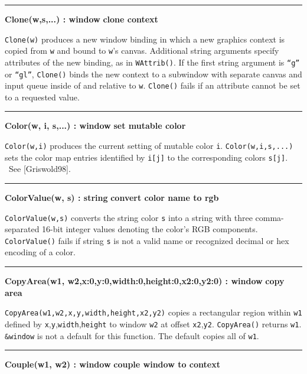 \bigskip\hrule\vspace{0.1cm}
\noindent
{\bf Clone(w,s,...) : window } \hfill {\bf clone context}

\noindent
\texttt{Clone(w)} produces a new window binding in which a new graphics
context is copied from \texttt{w} and bound to
\texttt{w}'s canvas. Additional string arguments
specify attributes of the new binding, as in \texttt{WAttrib()}. If the
first string argument is
\texttt{{\textquotedblleft}g{\textquotedblright}} or
\texttt{{\textquotedblleft}gl{\textquotedblright}}, \texttt{Clone()}
binds the new context to a subwindow with separate canvas and input
queue inside of and relative to \texttt{w}. \texttt{Clone()} fails if
an attribute cannot be set to a requested value.

\bigskip\hrule\vspace{0.1cm}
\noindent
{\bf Color(w, i, s,...) : window } \hfill {\bf set mutable color}

\noindent
\texttt{Color(w,i)} produces the current setting of mutable color
\texttt{i}. \texttt{Color(w,i,s,...)} sets the color map entries
identified by \texttt{i[j]} to the corresponding colors \texttt{s[j]}.
\ See [Griswold98].

\bigskip\hrule\vspace{0.1cm}
\noindent
{\bf ColorValue(w, s) : string } \hfill {\bf convert color name to rgb}

\noindent
\texttt{ColorValue(w,s)} converts the string color \texttt{s} into a
string with three comma-separated 16-bit integer values denoting the
color's RGB components. \texttt{ColorValue()} fails if
string \texttt{s} is not a valid name or recognized decimal or hex
encoding of a color.

\bigskip\hrule\vspace{0.1cm}
\noindent
{\bf CopyArea(w1, w2,x:0,y:0,width:0,height:0,x2:0,y2:0) : window } \hfill {\bf copy area}

\noindent
\texttt{CopyArea(w1,w2,x,y,width,height,x2,y2)} copies a rectangular
region within \texttt{w1} defined by
\texttt{x},\texttt{y},\texttt{width},\texttt{height} to window
\texttt{w2} at offset \texttt{x2},\texttt{y2}. \texttt{CopyArea()}
returns \texttt{w1}. \texttt{\&window} is not a default for this
function. The default copies all of \texttt{w1}.

\bigskip\hrule\vspace{0.1cm}
\noindent
{\bf Couple(w1, w2) : window } \hfill {\bf couple window to context}


